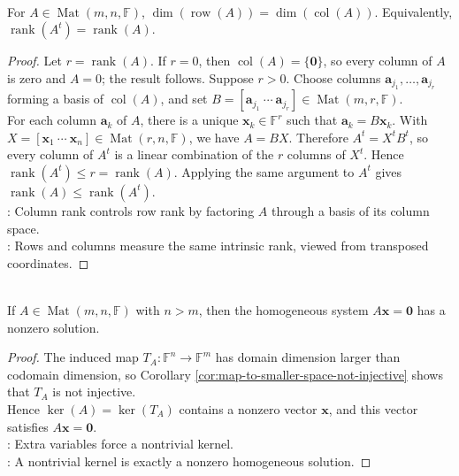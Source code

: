 \begin{theorem} \label{thm:row-rank-equals-column-rank} \\
For $A\in\operatorname{Mat}(m,n,\mathbb{F})$, $\dim(\operatorname{row}(A))=\dim(\operatorname{col}(A))$. Equivalently, $\operatorname{rank}(A^t)=\operatorname{rank}(A)$.
\begin{proof}
Let $r=\operatorname{rank}(A)$. If $r=0$, then $\operatorname{col}(A)=\{\mathbf{0}\}$, so every column of $A$ is zero and $A=0$; the result follows. Suppose $r>0$. Choose columns $\mathbf{a}_{j_1},\ldots,\mathbf{a}_{j_r}$ forming a basis of $\operatorname{col}(A)$, and set $B=[\mathbf{a}_{j_1}\ \cdots\ \mathbf{a}_{j_r}]\in\operatorname{Mat}(m,r,\mathbb{F})$.\\
For each column $\mathbf{a}_k$ of $A$, there is a unique $\mathbf{x}_k\in\mathbb{F}^r$ such that $\mathbf{a}_k=B\mathbf{x}_k$. With $X=[\mathbf{x}_1\ \cdots\ \mathbf{x}_n]\in\operatorname{Mat}(r,n,\mathbb{F})$, we have $A=BX$. Therefore $A^t=X^tB^t$, so every column of $A^t$ is a linear combination of the $r$ columns of $X^t$. Hence $\operatorname{rank}(A^t)\leq r=\operatorname{rank}(A)$. Applying the same argument to $A^t$ gives $\operatorname{rank}(A)\leq\operatorname{rank}(A^t)$.\\
: Column rank controls row rank by factoring $A$ through a basis of its column space.\\
: Rows and columns measure the same intrinsic rank, viewed from transposed coordinates.
\end{proof}
\end{theorem}

\begin{corollary} \label{cor:homogeneous-system-more-variables-than-equations} \\
If $A\in\operatorname{Mat}(m,n,\mathbb{F})$ with $n>m$, then the homogeneous system $A\mathbf{x}=\mathbf{0}$ has a nonzero solution.
\begin{proof}
The induced map $T_A:\mathbb{F}^n\to\mathbb{F}^m$ has domain dimension larger than codomain dimension, so Corollary \ref{cor:map-to-smaller-space-not-injective} shows that $T_A$ is not injective.\\
Hence $\ker(A)=\ker(T_A)$ contains a nonzero vector $\mathbf{x}$, and this vector satisfies $A\mathbf{x}=\mathbf{0}$.\\
: Extra variables force a nontrivial kernel.\\
: A nontrivial kernel is exactly a nonzero homogeneous solution.
\end{proof}
\end{corollary}

